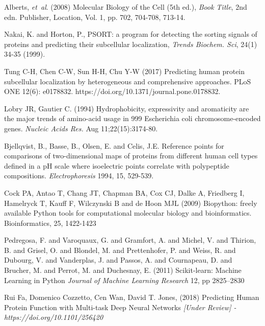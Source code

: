 \documentclass{bioinfo}
\begin{document}
\begin{thebibliography}{}

Alberts, \textit{et~al}. (2008) Molecular Biology of the Cell
(5th ed.), \textit{Book Title}, 2nd edn. Publisher, Location, Vol. 1, pp.
702, 704-708, 713-14.

Nakai, K. and Horton, P., PSORT: a program for detecting the sorting signals of proteins and predicting their subcellular localization, \textit{Trends Biochem. Sci}, 24(1) 34-35 (1999).

Tung C-H, Chen C-W, Sun H-H, Chu Y-W (2017) Predicting human protein subcellular localization by heterogeneous and comprehensive approaches. PLoS ONE 12(6): e0178832. https://doi.org/10.1371/journal.pone.0178832.


Lobry JR, Gautier C. (1994) Hydrophobicity, expressivity and aromaticity are the major trends of amino-acid usage in 999 Escherichia coli chromosome-encoded genes. \textit{Nucleic Acids Res.} Aug 11;22(15):3174-80.


Bjellqvist, B., Basse, B., Olsen, E. and Celis, J.E.
Reference points for comparisons of two-dimensional maps of proteins from
different human cell types defined in a pH scale where isoelectric points correlate with polypeptide compositions. \textit{Electrophoresis} 1994, 15, 529-539.

Cock PA, Antao T, Chang JT, Chapman BA, Cox CJ, Dalke A, Friedberg I, Hamelryck T, Kauff F, Wilczynski B and de Hoon MJL (2009) Biopython: freely available Python tools for computational molecular biology and bioinformatics. Bioinformatics, 25, 1422-1423

Pedregosa, F. and Varoquaux, G. and Gramfort, A. and Michel, V. and Thirion, B. and Grisel, O. and Blondel, M. and Prettenhofer, P. and Weiss, R. and Dubourg, V. and Vanderplas, J. and Passos, A. and Cournapeau, D. and Brucher, M. and Perrot, M. and Duchesnay, E. (2011) Scikit-learn: Machine Learning in Python \textit{Journal of Machine Learning Research} 12, pp 2825--2830

Rui Fa, Domenico Cozzetto, Cen Wan, David T. Jones, (2018)
Predicting Human Protein Function with Multi-task Deep Neural Networks
\textit{[Under Review] - https://doi.org/10.1101/256420} 


\end{thebibliography}
\appendix
\setcounter{secnumdepth}{0}
\end{document}

